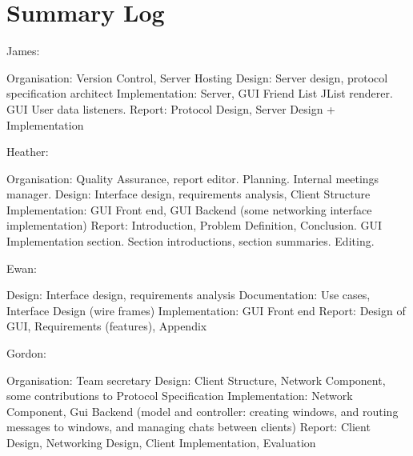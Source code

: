 \section{Summary Log}
\label{sumlog}

James:

Organisation: Version Control, Server Hosting
Design: Server design, protocol specification architect
Implementation: Server, GUI Friend List JList renderer. GUI User data listeners.
Report: Protocol Design, Server Design + Implementation

Heather:

Organisation: Quality Assurance, report editor. Planning. Internal meetings manager.
Design: Interface design, requirements analysis, Client Structure
Implementation: GUI Front end, GUI Backend (some networking interface implementation)
Report: Introduction, Problem Definition, Conclusion. GUI Implementation section. Section introductions, section summaries. Editing. 

Ewan:

Design: Interface design, requirements analysis
Documentation: Use cases, Interface Design (wire frames)
Implementation: GUI Front end
Report: Design of GUI, Requirements (features), Appendix 

Gordon:

Organisation: Team secretary
Design: Client Structure, Network Component, some contributions to Protocol Specification
Implementation: Network Component, Gui Backend (model and controller: creating windows, and routing messages to windows, and managing chats between clients)
Report: Client Design, Networking Design, Client Implementation, Evaluation
